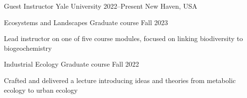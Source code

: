 

\begin{cventries}

  \cventry
    {Guest Instructor} %
    {Yale University} %
    {2022--Present} %
    {New Haven, USA} %
    {
      \begin{cvsubentries}
       \cvsubentry
        {Ecosystems and Landscapes}
        {\footnotesize Graduate course}
        {Fall 2023}
        {
         \begin{cvitems}
          \item Lead instructor on one of five course modules, focused on linking biodiversity to biogeochemistry
         \end{cvitems} 
        }
       \cvsubentry
         {Industrial Ecology}
         {\footnotesize Graduate course}
         {Fall 2022}
         {
         \begin{cvitems}
          \item Crafted and delivered a lecture introducing ideas and theories from metabolic ecology to urban ecology
         \end{cvitems} 
         }
      \end{cvsubentries}
    }


\end{cventries}
